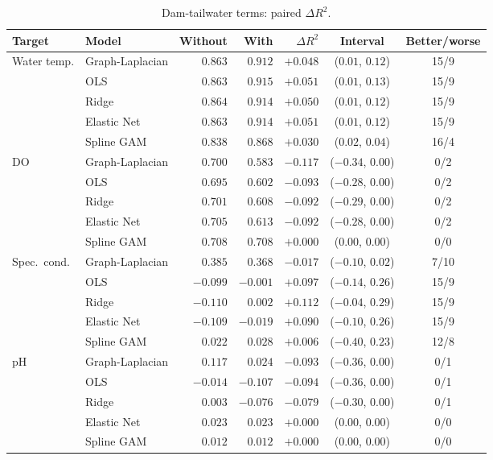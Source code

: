 \documentclass[11pt]{article}
\begin{document}
\begin{table}[h]
\centering
\small
\caption{Dam-tailwater terms: paired $\Delta R^2$.}
\label{tab:tailwater}
\begin{tabular}{ll rrrcc}
\toprule
Target & Model & Without & With & $\Delta R^2$ & Interval & Better/worse \\
\midrule
Water temp.   & Graph-Laplacian & $0.863$ & $0.912$ & $\mathbf{+0.048}$ & ($0.01$, $0.12$) & 15/9 \\
              & OLS             & $0.863$ & $0.915$ & $\mathbf{+0.051}$ & ($0.01$, $0.13$) & 15/9 \\
              & Ridge           & $0.864$ & $0.914$ & $\mathbf{+0.050}$ & ($0.01$, $0.12$) & 15/9 \\
              & Elastic Net     & $0.863$ & $0.914$ & $\mathbf{+0.051}$ & ($0.01$, $0.12$) & 15/9 \\
              & Spline GAM      & $0.838$ & $0.868$ & $\mathbf{+0.030}$ & ($0.02$, $0.04$) & 16/4 \\
\addlinespace
DO            & Graph-Laplacian & $0.700$ & $0.583$ & $-0.117$ & ($-0.34$, $0.00$) & 0/2 \\
              & OLS             & $0.695$ & $0.602$ & $-0.093$ & ($-0.28$, $0.00$) & 0/2 \\
              & Ridge           & $0.701$ & $0.608$ & $-0.092$ & ($-0.29$, $0.00$) & 0/2 \\
              & Elastic Net     & $0.705$ & $0.613$ & $-0.092$ & ($-0.28$, $0.00$) & 0/2 \\
              & Spline GAM      & $0.708$ & $0.708$ & $+0.000$ & ($0.00$, $0.00$) & 0/0 \\
\addlinespace
Spec.\ cond.  & Graph-Laplacian & $0.385$ & $0.368$ & $-0.017$ & ($-0.10$, $0.02$) & 7/10 \\
              & OLS             & $-0.099$ & $-0.001$ & $+0.097$ & ($-0.14$, $0.26$) & 15/9 \\
              & Ridge           & $-0.110$ & $0.002$ & $+0.112$ & ($-0.04$, $0.29$) & 15/9 \\
              & Elastic Net     & $-0.109$ & $-0.019$ & $+0.090$ & ($-0.10$, $0.26$) & 15/9 \\
              & Spline GAM      & $0.022$ & $0.028$ & $+0.006$ & ($-0.40$, $0.23$) & 12/8 \\
\addlinespace
pH            & Graph-Laplacian & $0.117$ & $0.024$ & $-0.093$ & ($-0.36$, $0.00$) & 0/1 \\
              & OLS             & $-0.014$ & $-0.107$ & $-0.094$ & ($-0.36$, $0.00$) & 0/1 \\
              & Ridge           & $0.003$ & $-0.076$ & $-0.079$ & ($-0.30$, $0.00$) & 0/1 \\
              & Elastic Net     & $0.023$ & $0.023$ & $+0.000$ & ($0.00$, $0.00$) & 0/0 \\
              & Spline GAM      & $0.012$ & $0.012$ & $+0.000$ & ($0.00$, $0.00$) & 0/0 \\
\bottomrule
\end{tabular}
\end{table}
\end{document}
